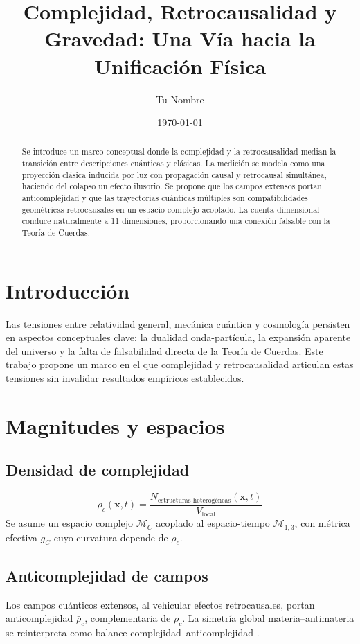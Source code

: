 \documentclass[reprint,amsmath,amssymb,aps]{revtex4-2}
\begin{document}
\title{Complejidad, Retrocausalidad y Gravedad: Una Vía hacia la Unificación Física}
\author{Tu Nombre}
\date{\today}

\begin{abstract}
Se introduce un marco conceptual donde la complejidad y la retrocausalidad median la transición entre descripciones cuánticas y clásicas. La medición se modela como una proyección clásica inducida por luz con propagación causal y retrocausal simultánea, haciendo del colapso un efecto ilusorio. Se propone que los campos extensos portan anticomplejidad y que las trayectorias cuánticas múltiples son compatibilidades geométricas retrocausales en un espacio complejo acoplado. La cuenta dimensional conduce naturalmente a 11 dimensiones, proporcionando una conexión falsable con la Teoría de Cuerdas.
\end{abstract}

\maketitle

\section{Introducción}
Las tensiones entre relatividad general, mecánica cuántica y cosmología persisten en aspectos conceptuales clave: la dualidad onda-partícula, la expansión aparente del universo y la falta de falsabilidad directa de la Teoría de Cuerdas. Este trabajo propone un marco en el que complejidad y retrocausalidad articulan estas tensiones sin invalidar resultados empíricos establecidos.

\section{Magnitudes y espacios}
\subsection{Densidad de complejidad}
\begin{equation}
\rho_c(\mathbf{x},t) = \frac{N_{\text{estructuras heterogéneas}}(\mathbf{x},t)}{V_{\text{local}}}
\end{equation}
Se asume un espacio complejo $\mathcal{M}_C$ acoplado al espacio-tiempo $\mathcal{M}_{1,3}$, con métrica efectiva $g_C$ cuyo curvatura depende de $\rho_c$.

\subsection{Anticomplejidad de campos}
Los campos cuánticos extensos, al vehicular efectos retrocausales, portan anticomplejidad $\bar{\rho}_c$, complementaria de $\rho_c$. La simetría global materia–antimateria se reinterpreta como balance complejidad–anticomplejidad \cite{Susskind2018, Maldacena1998}.
\end{document}
